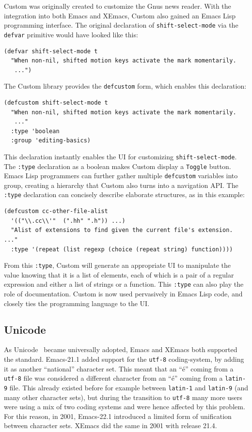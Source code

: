 \documentclass[format=acmsmall, review]{acmart}
\newcommand \Elisp {Emacs Lisp}
\begin{document}
Custom was originally created to customize the Gnus news reader.  With
the integration into both Emacs and XEmacs, Custom also gained an
\Elisp{} programming interface.  The original declaration of
\texttt{shift-select-mode} via the \texttt{defvar} primitive would
have looked like this:
%
\begin{verbatim}
(defvar shift-select-mode t
  "When non-nil, shifted motion keys activate the mark momentarily.
   ...")
\end{verbatim}
%
The Custom library provides the \texttt{defcustom} form, which enables
this declaration:
%
\begin{verbatim}
(defcustom shift-select-mode t
  "When non-nil, shifted motion keys activate the mark momentarily.
   ..."
  :type 'boolean
  :group 'editing-basics)
\end{verbatim}
%
This declaration instantly enables the UI for customizing
\texttt{shift-select-mode}.  The \texttt{:type} declaration as a
boolean makes Custom display a \texttt{Toggle} button.  \Elisp{}
programmers can further gather multiple \texttt{defcustom} variables
into group, creating a hierarchy that Custom also turns into a
navigation API.  The \texttt{:type} declaration can concisely describe
elaborate structures, as in this example:
\begin{verbatim}
(defcustom cc-other-file-alist
  '(("\\.cc\\'"  (".hh" ".h")) ...)
  "Alist of extensions to find given the current file's extension.
..."
  :type '(repeat (list regexp (choice (repeat string) function))))
\end{verbatim}
From this \texttt{:type}, Custom will generate an appropriate UI to
manipulate the value knowing that it is a list of elements, each of which is
a pair of a regular expression and either a list of strings or a function.
This \texttt{:type} can also play the role of documentation.
Custom is now used pervasively in \Elisp{} code, and closely ties the
programming language to the UI.

\subsection{Unicode}
\label{sec:unicode}

As Unicode~\cite{Unicode6} became universally adopted, Emacs and XEmacs both
supported the standard.  Emacs-21.1 added support for the \texttt{utf-8}
coding-system, by adding it as another ``national'' character set.
This meant that an ``é'' coming from a \texttt{utf-8} file was considered a different
character from an ``é'' coming from a \texttt{latin-9} file.  This already
existed before for example between \texttt{latin-1} and \texttt{latin-9} (and many other
character sets), but during the transition to \texttt{utf-8} many more users were
using a mix of two coding systems and were hence affected by this problem.
For this reason, in 2001, Emacs-22.1 introduced a limited form of
unification between character sets.  XEmacs did the same in 2001 with
release 21.4.
\end{document}
